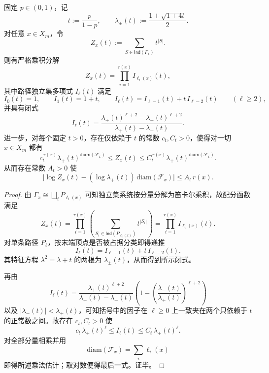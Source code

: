 \begin{theorem}[纤维后验配分函数的路径闭式与单根支配]\label{thm:conclusion-fiber-hardcore-partition-pressure-single-root}
固定 \(p\in(0,1)\)，记
\[
t:=\frac{p}{1-p},
\qquad
\lambda_\pm(t):=\frac{1\pm \sqrt{1+4t}}{2}.
\]
对任意 \(x\in X_m\)，令
\[
Z_x(t):=\sum_{S\in \mathsf{Ind}(\Gamma_x)} t^{|S|}.
\]
则有严格乘积分解
\[
Z_x(t)=\prod_{i=1}^{r(x)} I_{\ell_i(x)}(t),
\]
其中路径独立集多项式 \(I_\ell(t)\) 满足
\[
I_0(t)=1,\qquad
I_1(t)=1+t,\qquad
I_\ell(t)=I_{\ell-1}(t)+t\,I_{\ell-2}(t)\qquad (\ell\ge 2),
\]
并具有闭式
\[
I_\ell(t)=
\frac{\lambda_+(t)^{\ell+2}-\lambda_-(t)^{\ell+2}}
{\lambda_+(t)-\lambda_-(t)}.
\]
进一步，对每个固定 \(t>0\)，存在仅依赖于 \(t\) 的常数 \(c_t,C_t>0\)，使得对一切 \(x\in X_m\) 都有
\[
c_t^{\,r(x)}\lambda_+(t)^{\mathrm{diam}(\mathcal F_x)}
\le
Z_x(t)
\le
C_t^{\,r(x)}\lambda_+(t)^{\mathrm{diam}(\mathcal F_x)}.
\]
从而存在常数 \(A_t>0\) 使
\[
\bigl|
\log Z_x(t)-(\log\lambda_+(t))\,\mathrm{diam}(\mathcal F_x)
\bigr|
\le A_t\,r(x).
\]
\end{theorem}
\begin{proof}
由 \(\Gamma_x\cong\bigsqcup_i P_{\ell_i(x)}\) 可知独立集系统按分量分解为笛卡尔乘积，故配分函数满足
\[
Z_x(t)=\prod_{i=1}^{r(x)}\left(\sum_{S_i\in \mathsf{Ind}(P_{\ell_i(x)})} t^{|S_i|}\right)
=\prod_{i=1}^{r(x)} I_{\ell_i(x)}(t).
\]
对单条路径 \(P_\ell\)，按末端顶点是否被占据分类即得递推
\[
I_\ell(t)=I_{\ell-1}(t)+t\,I_{\ell-2}(t).
\]
其特征方程 \(\lambda^2=\lambda+t\) 的两根为 \(\lambda_\pm(t)\)，从而得到所示闭式。

再由
\[
I_\ell(t)
=
\frac{\lambda_+(t)^{\ell+2}}{\lambda_+(t)-\lambda_-(t)}
\left(
1-\left(\frac{\lambda_-(t)}{\lambda_+(t)}\right)^{\ell+2}
\right)
\]
以及 \(|\lambda_-(t)|<\lambda_+(t)\)，可知括号中的因子在 \(\ell\ge 0\) 上一致夹在两个只依赖于 \(t\) 的正常数之间。故存在 \(c_t,C_t>0\) 使
\[
c_t\,\lambda_+(t)^\ell\le I_\ell(t)\le C_t\,\lambda_+(t)^\ell.
\]
对全部分量相乘并用
\[
\mathrm{diam}(\mathcal F_x)=\sum_i\ell_i(x)
\]
即得所述乘法估计；取对数便得最后一式。证毕。
\end{proof}

